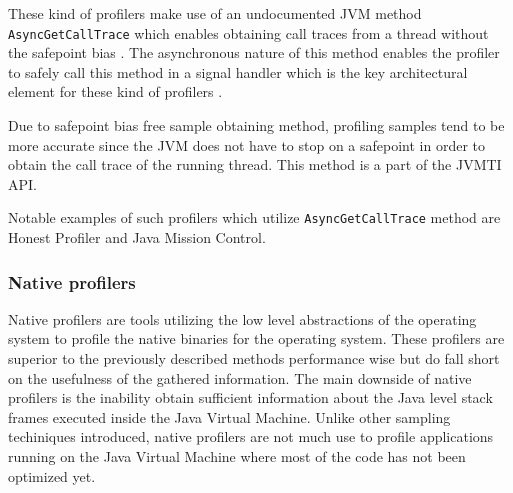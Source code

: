 \documentclass[..thesis.tex]{subfiles}
\begin{document}
These kind of profilers make use of an undocumented JVM method \texttt{Async\-Get\-Call\-Trace} which enables obtaining call traces from a thread without the safepoint bias \cite{agct_source}. The asynchronous nature of this method enables the profiler to safely call this method in a signal handler which is the key architectural element for these kind of profilers \cite{signal-safety7}.

Due to safepoint bias free sample obtaining method, profiling samples tend to be more accurate since the JVM does not have to stop on a safepoint in order to obtain the call trace of the running thread. This method is a part of the JVMTI API.

Notable examples of such profilers which utilize \texttt{Async\-Get\-Call\-Trace} method  are Honest Profiler and Java Mission Control. 

\subsubsection{Native profilers}
Native profilers are tools utilizing the low level abstractions of the operating system to  profile the native binaries for the operating system. These profilers are superior to the previously described methods performance wise but do fall short on the usefulness of the gathered information. The main downside of native profilers is the inability obtain sufficient information about the Java level stack frames executed inside the Java Virtual Machine. Unlike other sampling techiniques introduced, native profilers are not much use to profile applications running on the Java Virtual Machine where most of the code has not been optimized yet.


\end{document}
